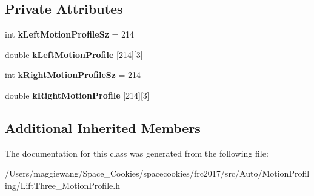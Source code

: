 \subsection*{Private Attributes}
\begin{DoxyCompactItemize}
\item 
\mbox{\label{class_lift_three___motion_profile_a90da7fce23a181a414d31f9e1bea66ce}} 
int {\bfseries k\+Left\+Motion\+Profile\+Sz} = 214
\item 
\mbox{\label{class_lift_three___motion_profile_ae3bd28d6ba1f1364bfa85225afa4c944}} 
double {\bfseries k\+Left\+Motion\+Profile} \mbox{[}214\mbox{]}\mbox{[}3\mbox{]}
\item 
\mbox{\label{class_lift_three___motion_profile_a755630b6159be136796a97a2fac1fbd3}} 
int {\bfseries k\+Right\+Motion\+Profile\+Sz} = 214
\item 
\mbox{\label{class_lift_three___motion_profile_a67072de36b4ee7ea11c988b58f69ce49}} 
double {\bfseries k\+Right\+Motion\+Profile} \mbox{[}214\mbox{]}\mbox{[}3\mbox{]}
\end{DoxyCompactItemize}
\subsection*{Additional Inherited Members}


The documentation for this class was generated from the following file\+:\begin{DoxyCompactItemize}
\item 
/\+Users/maggiewang/\+Space\+\_\+\+Cookies/spacecookies/frc2017/src/\+Auto/\+Motion\+Profiling/Lift\+Three\+\_\+\+Motion\+Profile.\+h\end{DoxyCompactItemize}
